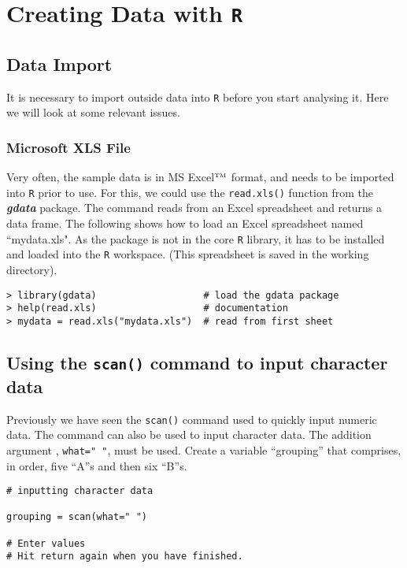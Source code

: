 \documentclass[a4paper,12pt]{article}
\begin{document}
\section{Creating Data with \texttt{R}}

\subsection{Data Import}
It is necessary to import outside data into \texttt{R} before you start analysing it. Here we will look at some relevant issues.

\subsubsection{Microsoft XLS File}
Very often, the sample data is in MS Excel$^{\mbox{\tiny{TM}}}$ format, and needs to be imported into \texttt{R} prior to use. For this, we could use the \texttt{read.xls()} function from the \textbf{\textit{gdata}} package. The command reads from an Excel spreadsheet and returns a data frame. The following shows how to load an Excel spreadsheet named ``mydata.xls". As the package is not in the core \texttt{R} library, it has to be installed and loaded into the \texttt{R} workspace. (This spreadsheet is saved in the working directory).
\begin{verbatim}
> library(gdata)                   # load the gdata package
> help(read.xls)                   # documentation
> mydata = read.xls("mydata.xls")  # read from first sheet
\end{verbatim}


\subsection{Using the \texttt{scan()} command to input character data}
Previously we have seen the \texttt{scan()} command used to quickly input numeric data. The command can also be used to input character data. The addition argument , \texttt{what=" "}, must be used.  
Create a variable “grouping” that comprises, in order,  five “A”s and then six “B”s.

\begin{verbatim}
# inputting character data

grouping = scan(what=" ")

# Enter values
# Hit return again when you have finished.

\end{verbatim}
\end{document}
